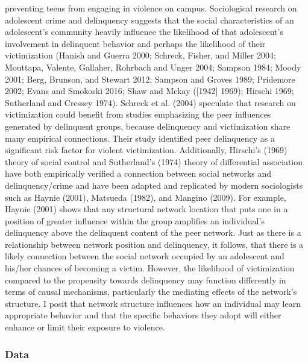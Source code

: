\documentclass[]{article}
\begin{document}
\begin{enumerate}
  preventing teens from engaging in violence on campus. Sociological
  research on adolescent crime and delinquency suggests that the social
  characteristics of an adolescent's community heavily influence the
  likelihood of that adolescent's involvement in delinquent behavior and
  perhaps the likelihood of their victimization (Hanish and Guerra 2000;
  Schreck, Fisher, and Miller 2004; Mouttapa, Valente, Gallaher,
  Rohrbach and Unger 2004; Sampson 1984; Moody 2001; Berg, Brunson, and
  Stewart 2012; Sampson and Groves 1989; Pridemore 2002; Evans and
  Smokoski 2016; Shaw and Mckay ({[}1942{]} 1969); Hirschi 1969;
  Sutherland and Cressey 1974). Schreck et al. (2004) speculate that
  research on victimization could benefit from studies emphasizing the
  peer influences generated by delinquent groups, because delinquency
  and victimization share many empirical connections. Their study
  identified peer delinquency as a significant risk factor for violent
  victimization. Additionally, Hirschi's (1969) theory of social control
  and Sutherland's (1974) theory of differential association have both
  empirically verified a connection between social networks and
  delinquency/crime and have been adapted and replicated by modern
  sociologists such as Haynie (2001), Matsueda (1982), and Mangino
  (2009). For example, Haynie (2001) shows that any structural network
  location that puts one in a position of greater influence within the
  group amplifies an individual's delinquency above the delinquent
  content of the peer network. Just as there is a relationship between
  network position and delinquency, it follows, that there is a likely
  connection between the social network occupied by an adolescent and
  his/her chances of becoming a victim. However, the likelihood of
  victimization compared to the propensity towards delinquency may
  function differently in terms of causal mechanisms, particularly the
  mediating effects of the network's structure. I posit that network
  structure influences how an individual may learn appropriate behavior
  and that the specific behaviors they adopt will either enhance or
  limit their exposure to violence.
\end{enumerate}

\subsubsection{Data}\label{data}
\end{document}
